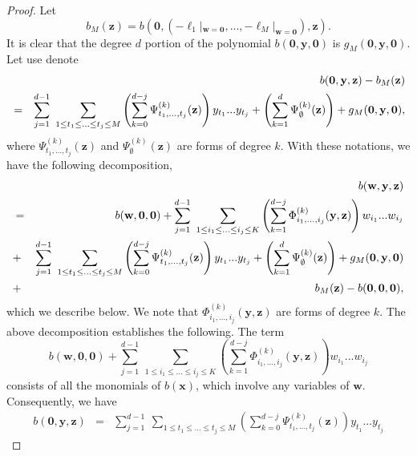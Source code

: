 \documentclass[12pt]{amsart}
\theoremstyle{definition}
\theoremstyle{remark}
\numberwithin{equation}{section}
\begin{document}
\begin{proof}
Let
$$
b_M(\mathbf{z}) = {b}(\mathbf{0}, (- \ell_1 |_{\mathbf{w} = \mathbf{0}}, ..., -\ell_M |_{\mathbf{w} = \mathbf{0}}), \mathbf{z} ).
$$
It is clear that the degree $d$ portion of the polynomial ${b}(\mathbf{0}, \mathbf{y}, \mathbf{0})$
is $g_M(\mathbf{0}, \mathbf{y}, \mathbf{0})$.
Let use denote
\begin{eqnarray}
\label{big equation in decomposition1}
&&{b}(\mathbf{0}, \mathbf{y}, \mathbf{z}) - b_M(\mathbf{z})
\\
&=& \sum_{j=1}^{d-1} \ \sum_{1 \leq t_1 \leq ... \leq t_{j} \leq M}
\left( \sum_{k=0}^{d-j} \Psi^{(k)}_{t_1, ..., t_{j}} ( \mathbf{z} )  \right) y_{t_1} ... y_{t_{j}}
+ \left( \sum_{k=1}^{d} \Psi^{(k)}_{\emptyset} ( \mathbf{z} ) \right)  + g_M(\mathbf{0}, \mathbf{y}, \mathbf{0}),
\notag
\end{eqnarray}
where $\Psi^{(k)}_{t_1, ..., t_{j}} ( \mathbf{z} )$ and
$\Psi^{(k)}_{\emptyset} ( \mathbf{z} )$ are forms of degree $k$.
With these notations, we have the following decomposition,
\begin{eqnarray}
\label{decomp of b 1}
&&{b}(\mathbf{w}, \mathbf{y}, \mathbf{z})
\\
&=&
{b}(\mathbf{w}, \mathbf{0}, \mathbf{0})
+ \sum_{j=1}^{d-1}  \ \sum_{1 \leq i_1 \leq ... \leq i_j \leq K}
\left( \sum_{k=1}^{d-j} \Phi^{(k)}_{i_1, ..., i_{j}} ( \mathbf{y}, \mathbf{z} )  \right) w_{i_1} ... w_{i_j}
\notag
\\
&+&
\sum_{j=1}^{d-1} \ \sum_{1 \leq t_1 \leq ... \leq t_{j} \leq M}
\left( \sum_{k=0}^{d-j} \Psi^{(k)}_{t_1, ..., t_{j}} ( \mathbf{z} )  \right) y_{t_1} ... y_{t_{j}}
+ \left( \sum_{k=1}^{d} \Psi^{(k)}_{\emptyset} ( \mathbf{z} ) \right)  + g_M(\mathbf{0}, \mathbf{y}, \mathbf{0})
\notag
\\
&+& b_M(\mathbf{z}) - b(\mathbf{0}, \mathbf{0},\mathbf{0}),
\notag
\end{eqnarray}
which we describe below.
We note that $\Phi^{(k)}_{i_1, ..., i_{j}} ( \mathbf{y}, \mathbf{z} )$
are forms of degree $k$.
The above decomposition establishes the following. The term
$$
{b}(\mathbf{w}, \mathbf{0}, \mathbf{0})
+ \sum_{j=1}^{d-1}  \ \sum_{1 \leq i_1 \leq ... \leq i_j \leq K}
\left( \sum_{k=1}^{d-j} \Phi^{(k)}_{i_1, ..., i_{j}} ( \mathbf{y}, \mathbf{z} )  \right) w_{i_1} ... w_{i_j}
$$
consists of all the monomials of $b(\mathbf{x})$, which involve any variables of $\mathbf{w}$.
Consequently, we have
\begin{eqnarray}
{b}(\mathbf{0}, \mathbf{y}, \mathbf{z})
&=&
\sum_{j=1}^{d-1} \ \sum_{1 \leq t_1 \leq ... \leq t_{j} \leq M}
\left( \sum_{k=0}^{d-j} \Psi^{(k)}_{t_1, ..., t_{j}} ( \mathbf{z} )  \right) y_{t_1} ... y_{t_{j}}

\end{eqnarray}
\end{proof}
\end{document}
